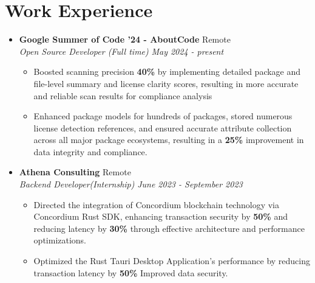 \documentclass[legalpaper,10.5pt]{article}
\begin{document}
\section{Work Experience}
\begin{itemize}[leftmargin=*]

\item \textbf{Google Summer of Code '24 - AboutCode}  \hfill {Remote} \\
\textit{Open Source Developer (Full time)}  \hfill \textit{May 2024 - present}
\begin{itemize}[label=$\diamond$]
    \item \small Boosted scanning precision \textbf{40\%} by implementing detailed package and file-level summary and license clarity scores, resulting in more accurate and reliable scan results for compliance analysis
    \item Enhanced package models for hundreds of packages, stored numerous license detection references, and ensured accurate attribute collection across all major package ecosystems, resulting in a \textbf{25\%} improvement in data integrity and compliance.

\end{itemize}

\item \textbf {Athena Consulting} \hfill Remote \\[3.75pt]
\textit{Backend Developer(Internship)} \hfill \textit{June 2023 - September 2023}
\begin{itemize}[label=$\diamond$]
    \item \small Directed the integration of Concordium blockchain technology via Concordium Rust SDK, enhancing transaction security by \textbf{50\%} and reducing latency by \textbf{30\%} through effective architecture and performance optimizations.
    \item \small Optimized the Rust Tauri Desktop Application's performance by reducing transaction latency by \textbf{50\%} Improved data security.
\end{itemize}
\end{itemize}
\end{document}
